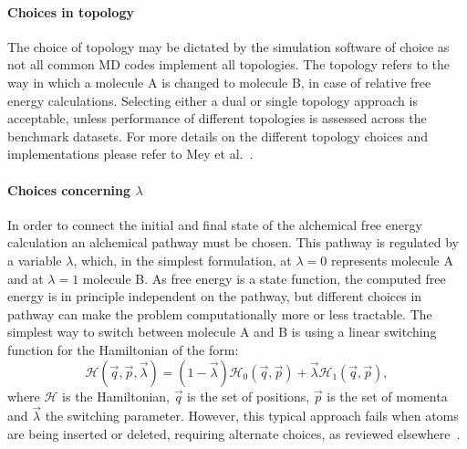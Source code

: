 \documentclass[9pt,bestpractices,pubversion]{livecoms}
\begin{document}
\paragraph{Choices in topology}
The choice of topology may be dictated by the simulation software of choice as not all common MD codes implement all topologies. The topology refers to the way in which a molecule A is changed to molecule B, in case of relative free energy calculations. Selecting either a dual or single topology approach is acceptable, unless performance of different topologies is assessed across the benchmark datasets. For more details on the different topology choices and implementations please refer to Mey et al.~\cite{meyBestPracticesAlchemical2020}.


\paragraph{Choices concerning $\lambda$}
In order to connect the initial and final state of the alchemical free energy calculation an alchemical pathway must be chosen. This pathway is regulated by a variable $\lambda$, which, in the simplest formulation, at $\lambda=0$ represents molecule A and at $\lambda=1$ molecule B. As free energy is a state function, the computed free energy is in principle independent on the pathway, but different choices in pathway can make the problem computationally more or less tractable. The simplest way to switch between molecule A and B is using a linear switching function for the Hamiltonian of the form:
\begin{equation}
\label{eq:switching}
\mathcal{H}(\vec{q},\vec{p},\vec{\lambda}) = (1-\vec{\lambda}) \mathcal{H}_0(\vec{q},\vec{p}) + \vec{\lambda}\mathcal{H}_1(\vec{q},\vec{p}),
\end{equation}
where $\mathcal{H}$ is the Hamiltonian, $\vec{q}$ is the set of positions, $\vec{p}$ is the set of momenta and $\vec{\lambda}$ the switching parameter. However, this typical approach fails when atoms are being inserted or deleted, requiring alternate choices, as reviewed elsewhere~\cite{meyBestPracticesAlchemical2020}.
\end{document}
